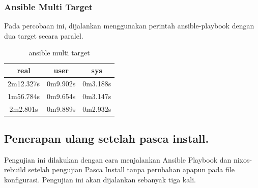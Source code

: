 \documentclass[10pt,]{report}
\begin{document}
\begin{adjustwidth}{20pt}{}
	\subsubsection{Ansible Multi Target}
	\begin{adjustwidth}{20pt}{}
		Pada percobaan ini, dijalankan menggunakan perintah ansible-playbook dengan dua
		target secara paralel.
		\begin{table}[H]
			\caption{ansible multi target}
			\begin{center}
				\begin{tabular}[c]{|c|c|c|}
					\hline
					\multicolumn{1}{|c|}{\textbf{real}} &
					\multicolumn{1}{c|}{\textbf{user}}  &
					\multicolumn{1}{c|}{\textbf{sys}}                         \\
					\hline
					2m12.327s                           & 0m9.902s & 0m3.188s \\
					\hline
					1m56.784s                           & 0m9.654s & 0m3.147s \\
					\hline
					2m2.801s                            & 0m9.889s & 0m2.932s \\
					\hline
				\end{tabular}
			\end{center}
		\end{table}
	\end{adjustwidth}
	\subsection{Penerapan ulang setelah pasca install.}
	\begin{adjustwidth}{20pt}{}
		Pengujian ini dilakukan dengan cara menjalankan Ansible Playbook dan nixos-rebuild
		setelah pengujian Pasca Install tanpa perubahan apapun pada file konfigurasi. Pengujian ini
		akan dijalankan sebanyak tiga kali.
	\end{adjustwidth}

\end{adjustwidth}
\end{document}
